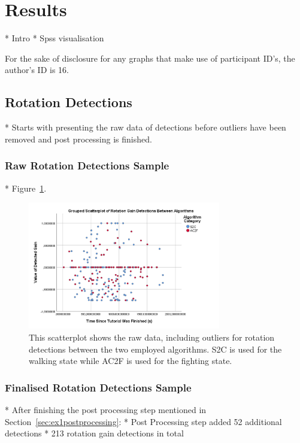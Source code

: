 \section{Results}\label{sec:ex1results}
* Intro
* Spss visualisation

For the sake of disclosure for any graphs that make use of participant ID's, the author's ID is 16. 

\subsection{Rotation Detections}
* Starts with presenting the raw data of detections before outliers have been removed and post processing is finished. 



\subsubsection{Raw Rotation Detections Sample}
* Figure~\ref{fig:rawRotationDetectionData}.
\begin{figure}[tbph]
    \centering
    \includegraphics[width=0.75\textwidth]{figures/graphs/RawRotationDetections.png}
    \caption[Raw Detection Scatterplot For Rotation Gains]{This scatterplot shows the raw data, including outliers for rotation detections between the two employed algorithms. S2C is used for the walking state while AC2F is used for the fighting state.}
    \label{fig:rawRotationDetectionData}
\end{figure}


\subsubsection{Finalised Rotation Detections Sample}
* After finishing the post processing step mentioned in Section~\ref{sec:ex1postprocessing}:
   * Post Processing step added 52 additional detections
* 213 rotation gain detections in total

